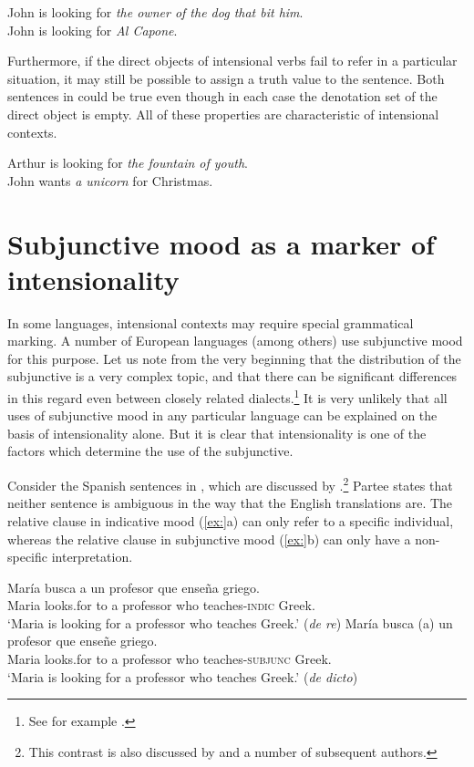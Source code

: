 \ea
\ea John is looking for \textit{the owner of the dog that bit him}.\\
\ex John is looking for \textit{Al Capone}.
                       \z
\z


Furthermore, if the direct objects of intensional verbs fail to refer in a particular situation, it may still be possible to assign a truth value to the sentence. Both sentences in  could be true even though in each case the denotation set of the direct object is empty. All of these properties are characteristic of intensional contexts.


\ea
\ea Arthur is looking for \textit{the fountain of youth}.\\
\ex John wants \textit{a unicorn} for Christmas.
                       \z
\z

\section{Subjunctive mood as a marker of intensionality}\label{sec:15.5}

In some languages, intensional contexts may require special grammatical marking. A number of European languages (among others) use subjunctive mood for this purpose. Let us note from the very beginning that the distribution of the subjunctive is a very complex topic, and that there can be significant differences in this regard even between closely related dialects.\footnote{See for example \citet{Marques2004}.} It is very unlikely that all uses of subjunctive mood in any particular language can be explained on the basis of intensionality alone. But it is clear that intensionality is one of the factors which determine the use of the subjunctive.



Consider the Spanish sentences in , which are discussed by \citet{Partee2008}.\footnote{This contrast is also discussed by \citet{Quine1956} and a number of subsequent authors.} Partee states that neither sentence is ambiguous in the way that the English translations are. The relative clause in indicative mood (\ref{ex:}a) can only refer to a specific individual, whereas the relative clause in subjunctive mood (\ref{ex:}b) can only have a non-specific interpretation.


\ea
\ea \gll María  busca  a  un  profesor  que  enseña  griego.\\
Maria  looks.for  to  a  professor  who  teaches-\textsc{indic}  Greek.\\
\glt ‘Maria is looking for a professor who teaches Greek.’  (\textit{de re})
\ex \gll María  busca  (a)  un  profesor  que  enseñe  griego.\\
Maria  looks.for  to  a  professor  who  teaches-\textsc{subjunc}  Greek.\\
\glt ‘Maria is looking for a professor who teaches Greek.’  (\textit{de dicto})
\z \z


